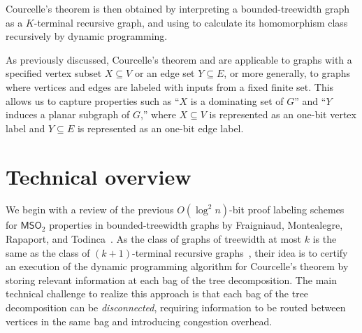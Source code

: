 \documentclass[11pt]{article}
\theoremstyle{definition}
\theoremstyle{remark}
\newcommand{\MSO}{\mathsf{MSO}_2}
\begin{document}
Courcelle’s theorem is then obtained by interpreting a bounded-treewidth graph as a $K$-terminal recursive graph, and using  to calculate its homomorphism class recursively by dynamic programming.

As previously discussed, Courcelle’s theorem and  are applicable to graphs with a specified vertex subset $X \subseteq V$ or an edge set $Y \subseteq E$, or more generally, to graphs where vertices and edges are labeled with inputs from a fixed finite set. This allows us to capture properties such as ``$X$ is a dominating set of $G$'' and ``$Y$ induces a planar subgraph of $G$,'' where $X \subseteq V$ is represented as an one-bit vertex label and $Y \subseteq E$ is represented as an one-bit edge label.





\section{Technical overview}\label{sect:overview}

We begin with a review of the previous $O(\log^2 n)$-bit proof labeling schemes for $\MSO$ properties in bounded-treewidth graphs by Fraigniaud, Montealegre, Rapaport, and Todinca~\cite{fraigniaud2024meta}. As the class of graphs of treewidth at most $k$ is the same as the class of $(k+1)$-terminal recursive graphs~\cite{bodlaender1998partial}, their idea is to certify an execution of the dynamic programming algorithm for Courcelle's theorem by storing relevant information at each bag of the tree decomposition. The main technical challenge to realize this approach is that each bag of the tree decomposition can be \emph{disconnected}, requiring information to be routed between vertices in the same bag and introducing congestion overhead.
\end{document}
